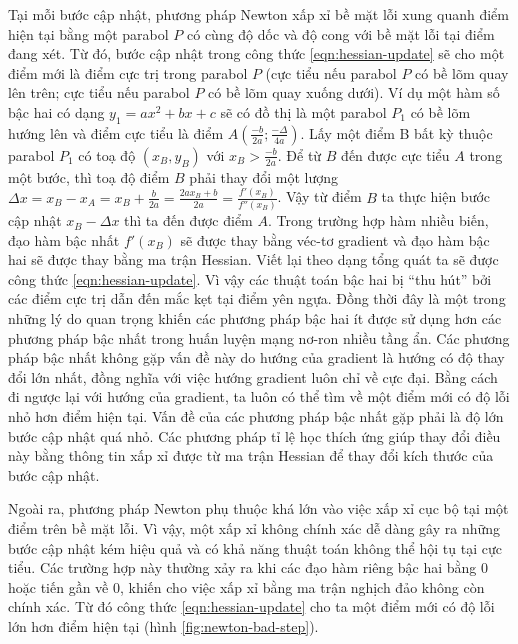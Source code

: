 Tại mỗi bước cập nhật, phương pháp Newton xấp xỉ bề mặt lỗi xung quanh điểm hiện tại bằng một parabol $P$ có cùng độ dốc và độ cong với bề mặt lỗi tại điểm đang xét. Từ đó, bước cập nhật trong công thức \ref{eqn:hessian-update} sẽ cho một điểm mới là điểm cực trị trong parabol $P$ (cực tiểu nếu parabol $P$ có bề lõm quay lên trên; cực tiểu nếu parabol $P$ có bề lõm quay xuống dưới). Ví dụ một hàm số bậc hai có dạng $y_1 = ax^2 + bx + c$ sẽ có đồ thị là một parabol $P_1$ có bề lõm hướng lên và điểm cực tiểu là điểm $A(\frac{-b}{2a};\frac{-\Delta}{4a})$. Lấy một điểm B bất kỳ thuộc parabol $P_1$ có toạ độ $(x_B,y_B)$ với $x_B > \frac{-b}{2a}$. Để từ $B$ đến được cực tiểu $A$ trong một bước, thì toạ độ điểm $B$ phải thay đổi một lượng $\Delta x = x_B - x_A = x_B + \frac{b}{2a} = \frac{2ax_B + b}{2a} = \frac{f'(x_B)}{f''(x_B)}$. Vậy từ điểm $B$ ta thực hiện bước cập nhật $x_B - \Delta x$ thì ta đến được điểm $A$. Trong trường hợp hàm nhiều biến, đạo hàm bậc nhất $f'(x_B)$ sẽ được thay bằng véc-tơ gradient và đạo hàm bậc hai sẽ được thay bằng ma trận Hessian. Viết lại theo dạng tổng quát ta sẽ được công thức \ref{eqn:hessian-update}. Vì vậy các thuật toán bậc hai bị ``thu hút'' bởi các điểm cực trị dẫn đến mắc kẹt tại điểm yên ngựa. Đồng thời đây là một trong những lý do quan trọng khiến các phương pháp bậc hai ít được sử dụng hơn các phương pháp bậc nhất trong huấn luyện mạng nơ-ron nhiều tầng ẩn. Các phương pháp bậc nhất không gặp vấn đề này do hướng của gradient là hướng có độ thay đổi lớn nhất, đồng nghĩa với việc hướng gradient luôn chỉ về cực đại. Bằng cách đi ngược lại với hướng của gradient, ta luôn có thể tìm về một điểm mới có độ lỗi nhỏ hơn điểm hiện tại. Vấn đề của các phương pháp bậc nhất gặp phải là độ lớn bước cập nhật quá nhỏ. Các phương pháp tỉ lệ học thích ứng giúp thay đổi điều này bằng thông tin xấp xỉ được từ ma trận Hessian để thay đổi kích thước của bước cập nhật.

Ngoài ra, phương pháp Newton phụ thuộc khá lớn vào việc xấp xỉ cục bộ tại một điểm trên bề mặt lỗi. Vì vậy, một xấp xỉ không chính xác dễ dàng gây ra những bước cập nhật kém hiệu quả và có khả năng thuật toán không thể hội tụ tại cực tiểu. Các trường hợp này thường xảy ra khi các đạo hàm riêng bậc hai bằng 0 hoặc tiến gần về 0, khiến cho việc xấp xỉ bằng ma trận nghịch đảo không còn chính xác. Từ đó công thức \ref{eqn:hessian-update} cho ta một điểm mới có độ lỗi lớn hơn điểm hiện tại (hình \ref{fig:newton-bad-step}).

